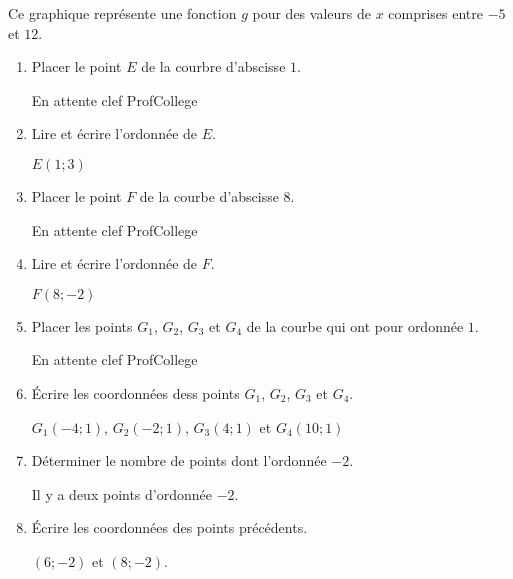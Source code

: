 \begin{corrige}
    Ce graphique représente une fonction $g$ pour des valeurs de $x$ comprises entre $-5$ et $12$.
    
    \hspace*{-7mm}
    \begin{enumerate}
        \item Placer le point $E$ de la courbre d'abscisse $1$.
        
        {\red En attente clef ProfCollege}
        \item Lire et écrire l'ordonnée de $E$.
        
        {\red $E(1;3)$}
        \item Placer le point $F$ de la courbe d'abscisse $8$.
        
        {\red En attente clef ProfCollege}
        \item Lire et écrire l'ordonnée de $F$.
        
        {\red $F(8;-2)$}
        \item Placer les points $G_1$, $G_2$, $G_3$ et $G_4$ de la courbe qui ont pour ordonnée $1$.
        
        {\red En attente clef ProfCollege}
        \item Écrire les coordonnées dess points $G_1$, $G_2$, $G_3$ et $G_4$.
        
        {\red $G_1(-4;1)$, $G_2(-2;1)$, $G_3(4;1)$ et $G_4(10;1)$}
        \item Déterminer le nombre de points dont l'ordonnée $-2$.
        
        {\red Il y a deux points d'ordonnée $-2$.}
        \item Écrire les coordonnées des points précédents.
        
        {\red $(6;-2)$ et $(8;-2)$.}
    \end{enumerate}
\end{corrige}
